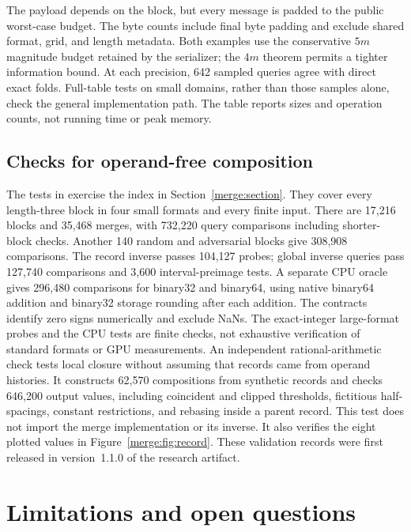 \documentclass[11pt,reqno]{amsart}
\theoremstyle{definition}
\theoremstyle{remark}
\numberwithin{equation}{section}
\begin{document}
The payload depends on the block, but every message is padded to the public
worst-case budget. The byte counts include final byte padding and exclude
shared format, grid, and length metadata. Both examples use the conservative
$5m$ magnitude budget retained by the serializer; the $4m$ theorem permits a
tighter information bound. At each precision, 642 sampled queries agree with
direct exact folds. Full-table tests on small domains, rather than those
samples alone, check the general implementation path. The table reports sizes
and operation counts, not running time or peak memory.


\subsection{Checks for operand-free composition}
The tests in  exercise the index in
Section~\ref{merge:section}. They cover every length-three block in four
small formats and every finite input. There are 17,216 blocks and
35,468 merges, with 732,220 query comparisons including
shorter-block checks. Another 140 random and adversarial blocks give
308,908 comparisons. The record inverse passes 104,127 probes; global
inverse queries pass 127,740 comparisons and 3,600 interval-preimage tests.
A separate CPU oracle gives 296,480 comparisons for binary32 and binary64,
using native binary64 addition and binary32 storage rounding after each
addition. The contracts identify zero signs numerically and exclude NaNs.
The exact-integer large-format probes and the CPU tests are finite checks,
not exhaustive verification of standard formats or GPU measurements.
An independent rational-arithmetic check tests local closure without
assuming that records came from operand histories. It constructs 62,570
compositions from synthetic records and checks 646,200 output values,
including coincident and clipped thresholds, fictitious half-spacings,
constant restrictions, and rebasing inside a parent record. This test does
not import the merge implementation or its inverse. It also verifies the
eight plotted values in Figure~\ref{merge:fig:record}.
These validation records were first released in version~1.1.0 of the
research artifact.



\section{Limitations and open questions}\label{sec:limitations}
\end{document}
